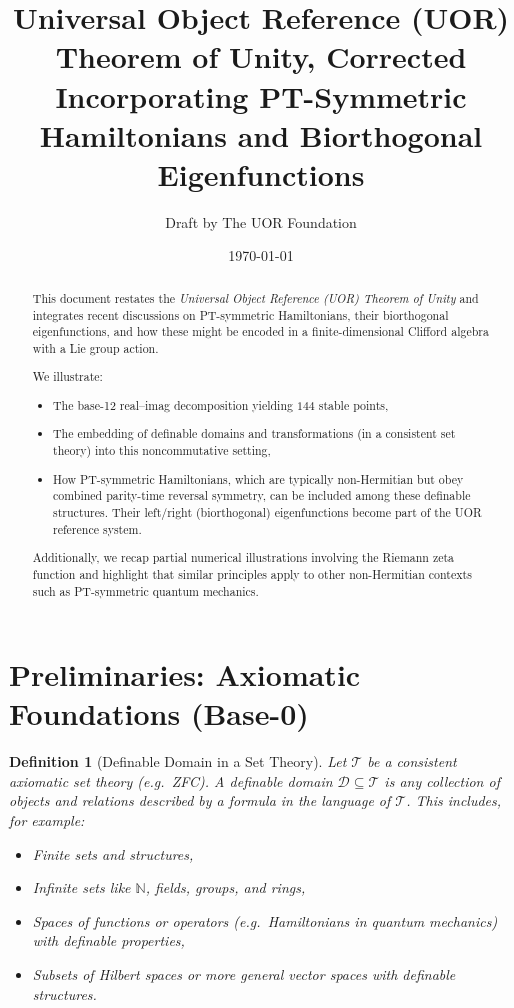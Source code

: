 \documentclass[11pt]{article}
\title{\textbf{Universal Object Reference (UOR) Theorem of Unity, Corrected}\\
\large Incorporating PT-Symmetric Hamiltonians and Biorthogonal Eigenfunctions}
\author{Draft by The UOR Foundation}
\date{\today}
\newtheorem{definition}[theorem]{Definition}
\begin{document}
\maketitle

\begin{abstract}
This document restates the \emph{Universal Object Reference (UOR) Theorem of Unity} and integrates recent discussions on PT-symmetric Hamiltonians, their biorthogonal eigenfunctions, and how these might be encoded in a finite-dimensional Clifford algebra with a Lie group action.  

We illustrate:
\begin{itemize}
    \item The base-12 real--imag decomposition yielding $144$ stable points,
    \item The embedding of definable domains and transformations (in a consistent set theory) into this noncommutative setting,
    \item How PT-symmetric Hamiltonians, which are typically non-Hermitian but obey combined parity-time reversal symmetry, can be included among these definable structures. Their left/right (biorthogonal) eigenfunctions become part of the UOR reference system.
\end{itemize}

Additionally, we recap partial numerical illustrations involving the Riemann zeta function and highlight that similar principles apply to other non-Hermitian contexts such as PT-symmetric quantum mechanics.
\end{abstract}

\tableofcontents

\section{Preliminaries: Axiomatic Foundations (Base-0)}
\label{sec:base0}

\begin{definition}[Definable Domain in a Set Theory]
Let $\mathcal{T}$ be a consistent axiomatic set theory (e.g.\ ZFC).  
A \emph{definable domain} $\mathcal{D}\subseteq \mathcal{T}$ is any collection of objects and relations described by a formula in the language of $\mathcal{T}$.  
This includes, for example:
\begin{itemize}
    \item Finite sets and structures,
    \item Infinite sets like $\mathbb{N}$, fields, groups, and rings,
    \item Spaces of functions or operators (e.g.\ Hamiltonians in quantum mechanics) with definable properties,
    \item Subsets of Hilbert spaces or more general vector spaces with definable structures.
\end{itemize}
\end{definition}
\end{document}
